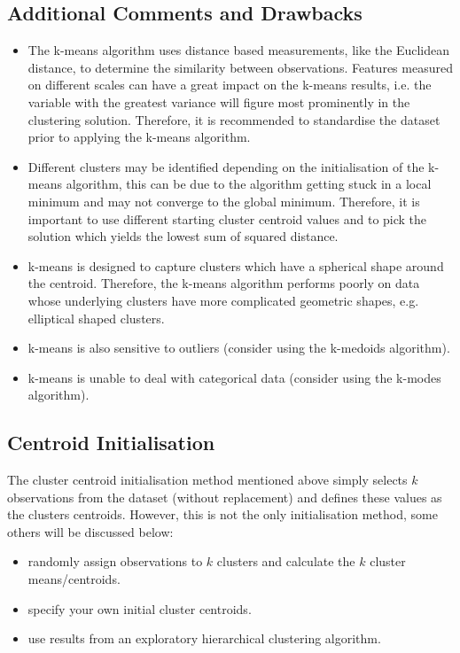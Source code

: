 \documentclass[]{article}
\begin{document}
\subsection{Additional Comments and Drawbacks}
\begin{itemize}
	\item The k-means algorithm uses distance based measurements, like the Euclidean distance, to determine the similarity between observations. Features measured on different scales can have a great impact on the k-means results, i.e. the variable with the greatest variance will figure most prominently in the clustering solution. Therefore, it is recommended to standardise the dataset prior to applying the k-means algorithm.
	\item Different clusters may be identified depending on the initialisation of the k-means algorithm, this can be due to the algorithm getting stuck in a local minimum and may not converge to the global minimum. Therefore, it is important to use different starting cluster centroid values and to pick the solution which yields the lowest sum of squared distance. 
	\item k-means is designed to capture clusters which have a spherical shape around the centroid. Therefore, the k-means algorithm performs poorly on data whose underlying clusters have more complicated geometric shapes, e.g. elliptical shaped clusters.  
	\item k-means is also sensitive to outliers (consider using the k-medoids algorithm).
	\item k-means is unable to deal with categorical data (consider using the k-modes algorithm). 
\end{itemize}

\subsection{Centroid Initialisation}
The cluster centroid initialisation method mentioned above simply selects $k$ observations from the dataset (without replacement) and defines these values as the clusters centroids. However, this is not the only initialisation method, some others will be discussed below: 
\begin{itemize}
	\item randomly assign observations to $k$ clusters and calculate the $k$ cluster means/centroids.
	\item specify your own initial cluster centroids.
	\item use results from an exploratory hierarchical clustering algorithm.
\end{itemize}
\end{document}
